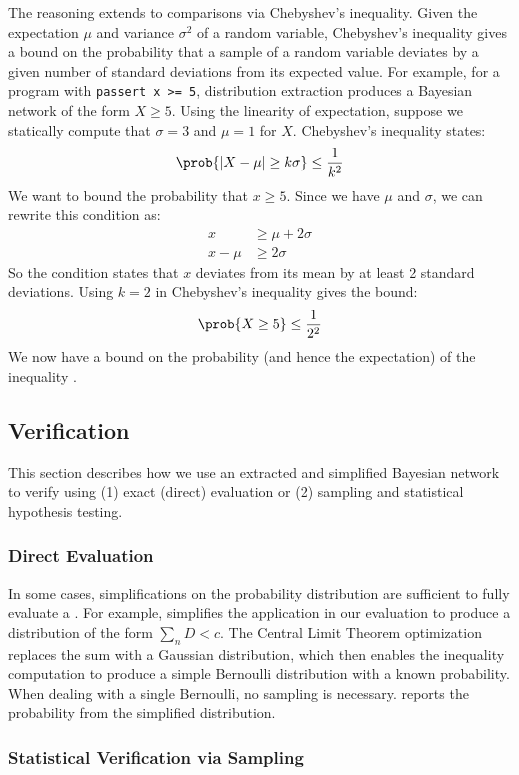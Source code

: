 The reasoning extends to comparisons via Chebyshev's inequality.
Given the expectation $\mu$ and variance $\sigma^2$ of a random variable,
Chebyshev's inequality
gives a bound on the probability that a sample of a random variable deviates
by a given number of standard deviations from its expected value.
For example, for a program with
\lstinline{passert x >= 5}, distribution extraction produces a Bayesian
network of the form $X \ge 5$.
Using the linearity of expectation, suppose we statically compute that $\sigma = 3$ and $\mu = 1$ for
$X$. Chebyshev's inequality states:
%
$$\prob{|X - \mu| \ge k\sigma} \le \frac{1}{k^2}$$
%
We want to bound the probability that $x \ge 5$. Since we have $\mu$ and $\sigma$, we can rewrite this condition as:
%
\begin{align*}
x &\ge \mu + 2\sigma \\
x - \mu &\ge 2\sigma
\end{align*}
%
So the \passert condition states that $x$ deviates from its mean by at least 2
standard deviations. Using $k=2$ in Chebyshev's inequality gives the bound:
%
$$\prob{X \ge 5} \le \frac{1}{2^2}$$
%
We now have a bound on the probability (and hence the expectation) of the
inequality .


\subsection{Verification}
\label{passert:sec:verification}
This section describes how we use an extracted and simplified Bayesian network to verify
\passerts using (1) exact (direct) evaluation or (2) sampling and
statistical hypothesis testing.

\subsubsection{Direct Evaluation}
\label{passert:sec:exact}
In some cases, simplifications on the probability distribution are
sufficient to fully evaluate a \passert. For example, \tool simplifies
the  application in our evaluation to produce a
distribution of the form $\sum_n D < c$. The Central Limit Theorem
optimization replaces the sum with a Gaussian distribution, which then
enables the inequality computation to produce a simple Bernoulli
distribution with a known probability.  When dealing with a single
Bernoulli, no sampling is necessary. \tool reports the probability
from the simplified distribution.

\subsubsection{Statistical Verification via Sampling}
\label{passert:sec:sample}

